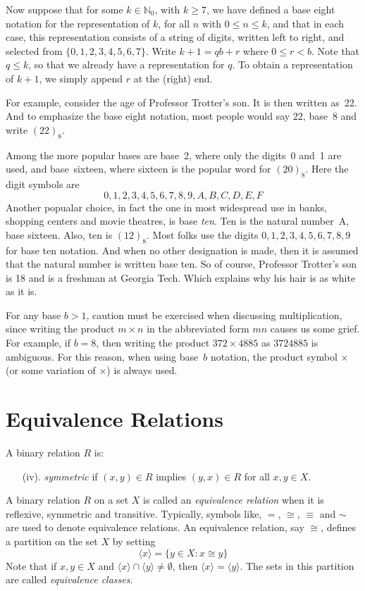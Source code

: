 Now suppose that for some $k\in \mathbb{N}_0$, with
$k\ge 7$, we have defined a base eight notation for the representation
of $k$, for all $n$ with $0\le n\le k$, and that in each case, 
this representation consists of a string of digits,
written left to right, and selected from $\{0,1,2,3,4,5,6,7\}$.
Write $k+1=qb+r$ where $0\le r<b$.  Note that $q\le k$, so that
we already have a representation for $q$.  To obtain a representation
of $k+1$, we simply append $r$ at the (right) end.  

For example, consider the age of Professor Trotter's son. It is then written
as~22.  And to emphasize the base eight notation, most people would
say $22$, base~$8$ and write $(22)_8$.  

Among the more popular bases are base~2, where only the digits~0 and~1
are used, and base~sixteen, where sixteen is the popular word for 
$(20)_8$.  Here the digit symbols are
\[
0,1,2,3,4,5,6,7,8,9,A,B,C,D,E,F
\]
Another popualar choice, in fact the one in most widespread use
in banks, shopping centers and movie theatres, is base \textit{ten}.
Ten is the natural number~A, base sixteen.  Also, ten is $(12)_8$.
Most folks use the digits $0,1,2,3,4,5,6,7,8,9$ for base ten
notation.  And when no other designation is made, then it is assumed
that the natural number is written base ten.  So of course, Professor
Trotter's son is 18 and is a freshman at Georgia Tech.  Which explains
why his hair is as white as it is.

For any base $b>1$, caution must be exercised when discussing 
multiplication, since writing the product $m\times n$ in the 
abbreviated form $mn$ causes us some grief.  For example, if $b = 8$,
then writing the product $372\times4885$ as $3724885$ is
ambiguous.  For this reason, when using base~$b$ notation, the
product symbol $\times$ (or some variation of $\times$)
is always used.

\section{Equivalence Relations}\label{sec:numsys:equivalence}

A binary relation $R$ is:

\begin{enumerate}
\item[(iv).] \textit{symmetric} if $(x,y)\in R$ implies $(y,x)\in R$ for
all $x,y\in X$.
\end{enumerate}

A binary relation $R$ on a set $X$ is called an
\textit{equivalence relation} when it is reflexive, symmetric
and transitive.  Typically, symbols like, $=$, $\cong$,
$\equiv$ and $\sim$ are used to
denote equivalence relations.  An equivalence relation, say
$\cong$, defines
a partition on the set $X$ by setting
\[
\langle x\rangle =\{y\in X: x\cong y\}
\]
Note that if $x,y\in X$ and $\langle x\rangle\cap\langle y\rangle
\neq\emptyset$, then $\langle x\rangle=\langle y\rangle$.
The sets in this partition are called \textit{equivalence classes}.

